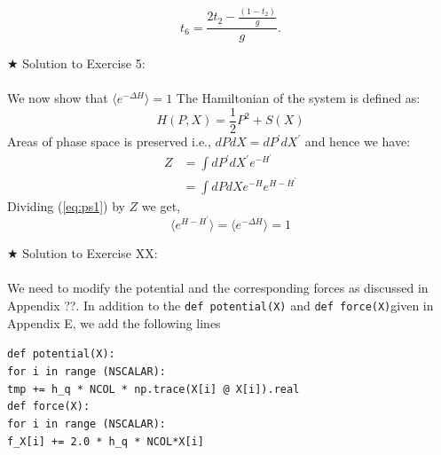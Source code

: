 \documentclass[11pt]{article}
\newcommand\tab[1][1cm]{\hspace*{#1}}
\begin{document}
     \begin{equation}
     	t_{6} = \frac{2t_{2} - \frac{(1-t_{2})}{g}}{g}. 
     \end{equation} 

\noindent $\bigstar$ Solution to Exercise 5:
\\ \\  We now show that $ \langle e^{-\Delta H} \rangle = 1$ 
The Hamiltonian of the system is defined as:
\begin{equation}
	H(P,X) = \frac{1}{2}P^2  + S(X)
\end{equation} 
Areas of phase space is preserved i.e., $dP dX = dP^{\prime} dX^{\prime}$
and hence we have:
\begin{align}
	\label{eq:ps1} 
	Z &= \int dP^{\prime} dX^{\prime} e^{-H^{\prime} \nonumber }  \\
	&=  \int dP dX e^{-H} e^{H-H^{\prime}}
\end{align}
Dividing (\ref{eq:ps1}) by $Z$ we get, 
\begin{equation}
	\langle e^{H-H^{\prime}} \rangle = 	\langle e^{-\Delta H} \rangle = 1
\end{equation}

\noindent $\bigstar$ Solution to Exercise XX:
\\ \\  

We need to modify the potential and the corresponding forces as 
discussed in Appendix ??. In addition to the \verb"def potential(X)" 
and \verb"def force(X)"given in Appendix E, we add the following lines 

\begin{footnotesize} 

\begin{mdframed}[backgroundcolor=blue!3] 
 \verb"def potential(X):" \\
 \tab	\verb"for i in range (NSCALAR):" \\ 
    \tab     \tab	\verb"tmp += h_q * NCOL * np.trace(X[i] @ X[i]).real" \\
    
\vspace{5mm} 
\noindent
\verb"def force(X):" \\ 
\tab	\verb"for i in range (NSCALAR):"  \\ 
       \tab  \tab 	\verb"f_X[i] += 2.0 * h_q * NCOL*X[i] "  

\end{mdframed}
\end{footnotesize}


\end{document}
